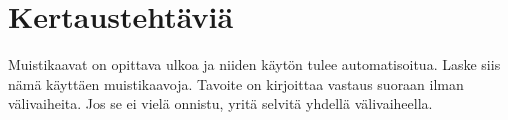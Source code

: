 \section{Kertaustehtäviä}


\begin{tehtavasivu}


\begin{tehtava}
   	Muistikaavat on opittava ulkoa ja niiden käytön tulee automatisoitua.
	Laske siis nämä käyttäen muistikaavoja. Tavoite on kirjoittaa vastaus suoraan ilman välivaiheita. Jos se ei vielä onnistu, yritä selvitä yhdellä välivaiheella.
    \begin{alakohdat}
    \end{alakohdat}
    \begin{vastaus}
        \begin{alakohdat}
        \end{alakohdat}
    \end{vastaus}
\end{tehtava}



\end{tehtavasivu}
